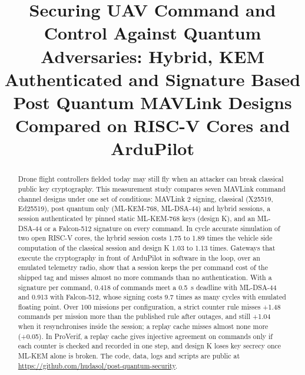 \documentclass[conference]{IEEEtran}
\begin{document}

\title{Securing UAV Command and Control Against Quantum Adversaries: Hybrid, KEM Authenticated and Signature Based Post Quantum MAVLink Designs Compared on RISC-V Cores and ArduPilot}
\author{
\and
{}
}
\maketitle

\begin{abstract}
Drone flight controllers fielded today may still fly when an attacker can break classical public key cryptography. This measurement study compares seven MAVLink command channel designs under one set of conditions: MAVLink 2 signing, classical (X25519, Ed25519), post quantum only (ML-KEM-768, ML-DSA-44) and hybrid sessions, a session authenticated by pinned static ML-KEM-768 keys (design K), and an ML-DSA-44 or a Falcon-512 signature on every command. In cycle accurate simulation of two open RISC-V cores, the hybrid session costs 1.75 to 1.89 times the vehicle side computation of the classical session and design K 1.03 to 1.13 times. Gateways that execute the cryptography in front of ArduPilot in software in the loop, over an emulated telemetry radio, show that a session keeps the per command cost of the shipped tag and misses almost no more commands than no authentication. With a signature per command, 0.418 of commands meet a 0.5~s deadline with ML-DSA-44 and 0.913 with Falcon-512, whose signing costs 9.7 times as many cycles with emulated floating point. Over 100 missions per configuration, a strict counter rule misses \mbox{+1.48} commands per mission more than the published rule after outages, and still \mbox{+1.04} when it resynchronises inside the session; a replay cache misses almost none more (\mbox{+0.05}). In ProVerif, a replay cache gives injective agreement on commands only if each counter is checked and recorded in one step, and design K loses key secrecy once ML-KEM alone is broken. The code, data, logs and scripts are public at \url{https://github.com/hudasol/post-quantum-security}.
\end{abstract}
\end{document}
